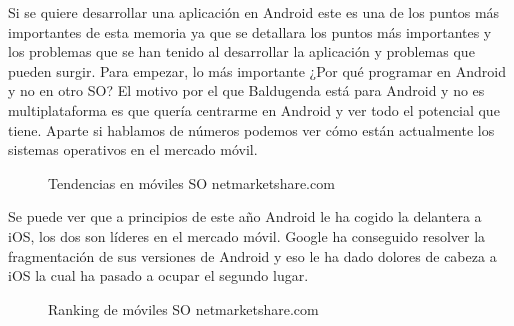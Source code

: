 Si se quiere desarrollar una aplicación en Android este es una de los puntos más importantes de esta memoria ya que se detallara los puntos más importantes y los problemas que se han tenido al desarrollar la aplicación y problemas que pueden surgir.
Para empezar, lo más importante ¿Por qué programar en Android y no en otro SO?
El motivo por el que Baldugenda está para Android  y no es multiplataforma es que quería centrarme en Android y ver todo el potencial que tiene.
Aparte si hablamos de números podemos ver cómo están actualmente los sistemas operativos en el mercado móvil.

\begin{figure}[H] 
  \begin{center} 
    \caption{Tendencias en móviles SO netmarketshare.com} 
    \label{fig:TendenciasSO} 
  \end{center} 
\end{figure}

Se puede ver que a principios de este año Android le ha cogido la delantera a iOS, los dos son líderes en el mercado móvil.
Google ha conseguido resolver la fragmentación de sus versiones de Android y eso le ha dado dolores de cabeza a iOS la cual ha pasado a ocupar el segundo lugar.

\begin{figure}[H] 
  \begin{center} 
    \caption{Ranking de móviles SO netmarketshare.com} 
    \label{fig:TendenciasSO} 
  \end{center} 
\end{figure}

